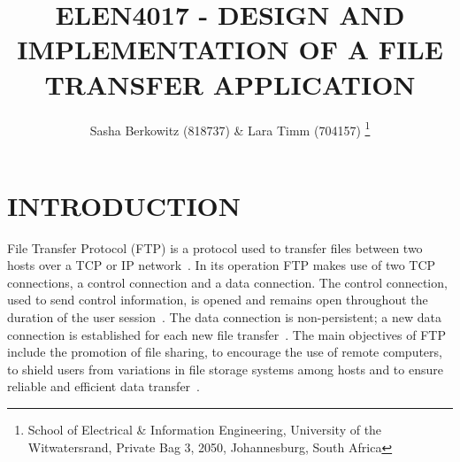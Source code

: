 \documentclass[10pt,twocolumn]{witseiepaper}
\begin{document}
\title{ELEN4017 - DESIGN AND IMPLEMENTATION OF A FILE TRANSFER APPLICATION}

\author{Sasha Berkowitz (818737) \& Lara Timm (704157)
\thanks{School of Electrical \& Information Engineering, University of the
Witwatersrand, Private Bag 3, 2050, Johannesburg, South Africa}
}


%


\maketitle
\pagestyle{plain}
\setcounter{page}{1}


\section{INTRODUCTION}

File Transfer Protocol (FTP) is a protocol used  to transfer files between two hosts over a TCP or IP network~\cite{FTPbeginners}. In its operation FTP makes use of two TCP connections, a control connection and a data connection. The control connection, used to send control information, is opened and remains open throughout the duration of the user session~\cite{topDownApproach6th}. The data connection is non-persistent; a new data connection is established for each new file transfer~\cite{topDownApproach6th}. The main objectives of FTP include the promotion of file sharing, to encourage the use of remote computers, to shield users from variations in file storage systems among hosts and to ensure reliable and efficient data transfer~\cite{rfc959}. 
\end{document}
